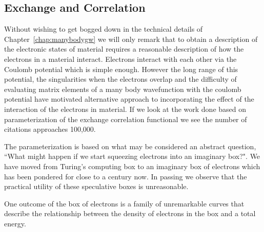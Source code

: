 \subsection{Exchange and Correlation}
Without wishing to get bogged down in the technical details of Chapter~\ref{chap:manybodygw}
we will only remark that to obtain a description of the electronic states of material requires
a reasonable description of how the electrons in a material interact. Electrons interact
with each other via the Coulomb potential which is simple enough. However the long range of 
this potential, the singularities when the electrons overlap and the difficulty of evaluating
matrix elements of a many body wavefunction with the coulomb potential have motivated alternative
approach to incorporating the effect of the interaction of the electrons in material.
If we look at the work done based on parameterization of the exchange correlation functional 
we see the number of citations approaches 100,000.

The parameterization is based on what may be considered an abstract question,
``What might happen if we start squeezing electrons into an imaginary box?".
We have moved from Turing's computing box to an imaginary box of electrons
which has been pondered for close to a century now. In passing 
we observe that the practical utility of these speculative 
boxes is unreasonable. 

One outcome of the box of electrons is a family of 
unremarkable curves that describe the relationship between
the density of electrons in the box and a total energy. 

